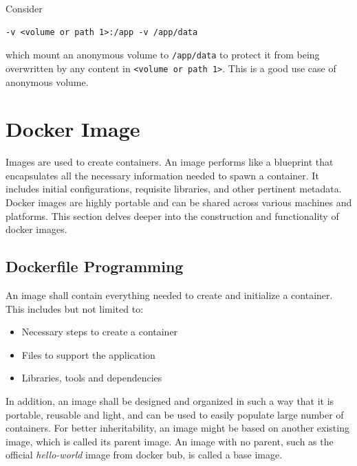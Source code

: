 Consider
\begin{lstlisting}
-v <volume or path 1>:/app -v /app/data
\end{lstlisting} 
which mount an anonymous volume to \verb|/app/data| to protect it from being overwritten by any content in \verb|<volume or path 1>|. This is a good use case of anonymous volume.

\section{Docker Image} \label{ch:vac:sec:di}

Images are used to create containers. An image performs like a blueprint that encapsulates all the necessary information needed to spawn a container. It includes initial configurations, requisite libraries, and other pertinent metadata. Docker images are highly portable and can be shared across various machines and platforms. This section delves deeper into the construction and functionality of docker images.

\subsection{Dockerfile Programming}

An image shall contain everything needed to create and initialize a container. This includes but not limited to:
\begin{itemize}
  \item Necessary steps to create a container
  \item Files to support the application
  \item Libraries, tools and dependencies
\end{itemize}
In addition, an image shall be designed and organized in such a way that it is portable, reusable and light, and can be used to easily populate large number of containers. For better inheritability, an image might be based on another existing image, which is called its parent image. An image with no parent, such as the official \textit{hello-world} image from docker bub, is called a base image.

